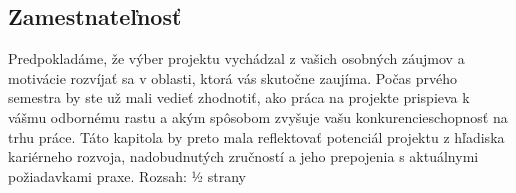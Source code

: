 \subsection{Zamestnateľnosť}
Predpokladáme, že výber projektu vychádzal z vašich osobných záujmov a motivácie rozvíjať sa v oblasti, ktorá vás skutočne zaujíma. Počas prvého semestra by ste už mali vedieť zhodnotiť, ako práca na projekte prispieva k vášmu odbornému rastu a akým spôsobom zvyšuje vašu konkurencieschopnosť na trhu práce. Táto kapitola by preto mala reflektovať potenciál projektu z hľadiska kariérneho rozvoja, nadobudnutých zručností a jeho prepojenia s aktuálnymi požiadavkami praxe. Rozsah: ½ strany